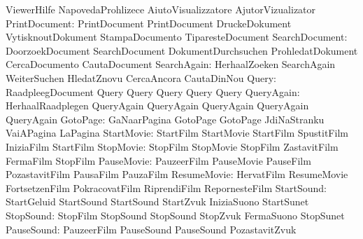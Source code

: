                            ViewerHilfe               NapovedaProhlizece
                           AiutoVisualizzatore       AjutorVizualizator
            PrintDocument: PrintDocument             PrintDocument
                           DruckeDokument            VytisknoutDokument
                           StampaDocumento           TiparesteDocument
           SearchDocument: DoorzoekDocument          SearchDocument
                           DokumentDurchsuchen       ProhledatDokument
                           CercaDocumento            CautaDocument
              SearchAgain: HerhaalZoeken             SearchAgain
                           WeiterSuchen              HledatZnovu
                           CercaAncora               CautaDinNou
                    Query: RaadpleegDocument         Query  
                           Query                     Query
                           Query                     Query %
               QueryAgain: HerhaalRaadplegen         QueryAgain
                           QueryAgain                QueryAgain
                           QueryAgain                QueryAgain %
                 GotoPage: GaNaarPagina              GotoPage
                           GotoPage                  JdiNaStranku
                           VaiAPagina                LaPagina %
               StartMovie: StartFilm                 StartMovie
                           StartFilm                 SpustitFilm
                           IniziaFilm                StartFilm
                StopMovie: StopFilm                  StopMovie
                           StopFilm                  ZastavitFilm
                           FermaFilm                 StopFilm
               PauseMovie: PauzeerFilm               PauseMovie
                           PauseFilm                 PozastavitFilm
                           PausaFilm                 PauzaFilm
              ResumeMovie: HervatFilm                ResumeMovie
                           FortsetzenFilm            PokracovatFilm
                           RiprendiFilm              RepornesteFilm
               StartSound: StartGeluid               StartSound
                           StartSound                StartZvuk
                           IniziaSuono               StartSunet %
                StopSound: StopFilm                  StopSound
                           StopSound                 StopZvuk
                           FermaSuono                StopSunet %
               PauseSound: PauzeerFilm               PauseSound
                           PauseSound                PozastavitZvuk  
